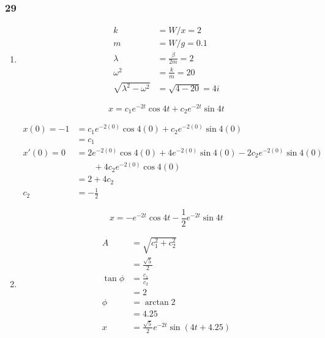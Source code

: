 \documentclass{article}
\begin{document}
\subsubsection{29}

\begin{enumerate}
  \item

        \begin{align*}
          k                           & = W / x = 2            \\
          m                           & = W / g = 0.1          \\
          \lambda                     & = \frac{\beta}{2m} = 2 \\
          \omega^2                    & = \frac{k}{m} = 20     \\
          \sqrt{\lambda^2 - \omega^2} & = \sqrt{4 - 20} = 4 i
        \end{align*}

        \[x = c_1 e^{-2 t} \cos 4 t + c_2 e^{-2 t} \sin 4 t\]

        \begin{align*}
          x(0) = -1 & = c_1 e^{-2 (0)} \cos 4 (0) + c_2 e^{-2 (0)} \sin 4 (0)                           \\
                    & = c_1                                                                             \\
          x'(0) = 0 & = 2 e^{-2 (0)} \cos 4 (0) + 4 e^{-2 (0)} \sin 4 (0) - 2 c_2 e^{-2 (0)} \sin 4 (0) \\
                    & \qquad + 4 c_2 e^{-2 (0)} \cos 4 (0)                                              \\
                    & = 2 + 4 c_2                                                                       \\
          c_2       & = -\frac{1}{2}
        \end{align*}

        \[x = -e^{-2t} \cos 4t - \frac{1}{2} e^{-2t} \sin 4t\]

  \item

        \begin{align*}
          A         & = \sqrt{c_1^2 + c_2^2}                        \\
                    & = \frac{\sqrt{5}}{2}                          \\
          \tan \phi & = \frac{c_1}{c_2}                             \\
                    & = 2                                           \\
          \phi      & = \arctan 2                                   \\
                    & = 4.25                                        \\
          x         & = \frac{\sqrt{5}}{2} e^{-2t} \sin (4t + 4.25)
        \end{align*}


\end{enumerate}
\end{document}
